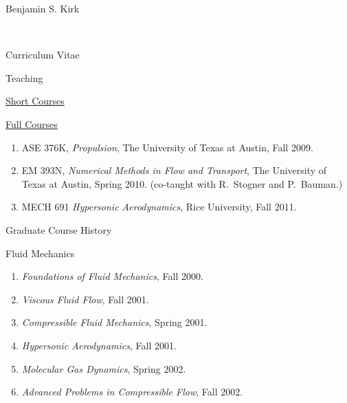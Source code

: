 \documentclass[10pt]{report}
\begin{document}
\begin{cv}{\centerline{\Large Benjamin S. Kirk}\\
    \centerline{\large Curriculum Vitae}}
  \begin{cvlist}{Teaching}

    \item[\underline{Short Courses}]    

    \vspace{1em}
    \item[\underline{Full Courses}] 
      \begin{enumerate}
        \item ASE 376K, \emph{Propulsion}, The University of Texas at Austin, Fall 2009.
        \item EM 393N, \emph{Numerical Methods in Flow and Transport}, The University of Texas at Austin, Spring 2010. (co-taught with R.~Stogner and P.~Bauman.)
        \item MECH 691 \emph{Hypersonic Aerodynamics}, Rice University, Fall 2011.
      \end{enumerate}
  \end{cvlist}


  \begin{cvlist}{Graduate Course History}
      \item[Fluid Mechanics]
	
	\begin{enumerate}
  	  \item \emph{Foundations of Fluid Mechanics}, Fall 2000.
	  \item \emph{Viscous Fluid Flow}, Fall 2001.
	  \item \emph{Compressible Fluid Mechanics}, Spring 2001.
	  \item \emph{Hypersonic Aerodynamics}, Fall 2001.
	  \item \emph{Molecular Gas Dynamics}, Spring 2002.
	  \item \emph{Advanced Problems in Compressible Flow}, Fall 2002.
	\end{enumerate}


\end{cvlist}
\end{cv}
\end{document}

